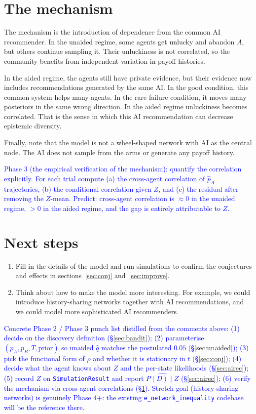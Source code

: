 \documentclass[12pt]{article}
\newcommand{\ignacio}[1]{\textcolor{blue}{#1}}
\begin{document}
\section{The mechanism}
\label{sec:mech}

The mechanism is the introduction of dependence from the common AI recommender.
In the unaided regime, some agents get unlucky and abandon $A$, but others continue sampling it.
Their unluckiness is not correlated, so the community benefits from independent variation in payoff histories.

In the aided regime, the agents still have private evidence, but their evidence now includes recommendations generated by the same AI.
In the good condition, this common system helps many agents.
In the rare failure condition, it moves many posteriors in the same wrong direction.
In the aided regime unluckiness becomes correlated.
That is the sense in which this AI recommendation can decrease epistemic diversity.

Finally, note that the model is not a wheel-shaped network with AI as the central node.
The AI does not sample from the arms or generate any payoff history.

\ignacio{Phase 3 (the empirical verification of the mechanism): quantify the correlation explicitly. For each trial compute (a) the cross-agent correlation of $\hat p_A$ trajectories, (b) the conditional correlation given $Z$, and (c) the residual after removing the $Z$-mean. Predict: cross-agent correlation is $\approx 0$ in the unaided regime, $> 0$ in the aided regime, and the gap is entirely attributable to $Z$.}

\section{Next steps}
\label{sec:next}

\begin{enumerate}[leftmargin=*]
  \item Fill in the details of the model and run simulations to confirm the conjectures and effects in sections~\ref{sec:conj} and~\ref{sec:improve}.
  \item Think about how to make the model more interesting.
    For example, we could introduce history-sharing networks together with AI recommendations, and we could model more sophisticated AI recommenders.
\end{enumerate}

\ignacio{Concrete Phase 2 / Phase 3 punch list distilled from the comments above: (1) decide on the discovery definition (\S\ref{sec:bandit}); (2) parameterise $(p_A, p_B, T, \text{prior})$ so unaided $\hat q$ matches the postulated $0.05$ (\S\ref{sec:unaided}); (3) pick the functional form of $\rho$ and whether it is stationary in $t$ (\S\ref{sec:conj}); (4) decide what the agent knows about $Z$ and the per-state likelihoods (\S\ref{sec:airec}); (5) record $Z$ on \texttt{SimulationResult} and report $\widehat{P(D) \mid Z}$ (\S\ref{sec:airec}); (6) verify the mechanism via cross-agent correlations (\S\ref{sec:mech}). Stretch goal (history-sharing networks) is genuinely Phase 4+: the existing \texttt{e\_network\_inequality} codebase will be the reference there.}
\end{document}
